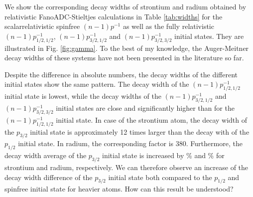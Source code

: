 

We show the corresponding decay
widths of strontium and radium obtained by relativistic FanoADC-Stieltjes
calculations in Table \ref{tab:widths}
for the scalarrelativistic spinfree $(n-1)p^{-1}$ as well as the
fully relativistic $(n-1)p_{1/2,1/2}^{-1}$, $(n-1)p_{3/2,1/2}^{-1}$ and
$(n-1)p_{3/2,3/2}^{-1}$ initial states. They are illustrated in Fig. \ref{fig:gamma}.
To the best of my knowledge, the Auger-Meitner decay widths of these systems have
not been presented in the literature so far.

Despite the difference in absolute numbers, the decay widths
of the different initial states show the same pattern. The decay width of
the $(n-1)p_{1/2,1/2}^{-1}$ initial state is lowest, while the decay widths
of the $(n-1)p_{3/2,1/2}^{-1}$ and
$(n-1)p_{3/2,3/2}^{-1}$ initial states are close and significantly higher than
for the $(n-1)p_{1/2,1/2}^{-1}$ initial state.
In case of the strontium atom, the decay width of the $p_{3/2}$ initial state
is approximately 12 times larger than the decay with of the $p_{1/2}$ initial state.
In radium, the corresponding factor is 380.
Furthermore, the decay width average of the $p_{3/2}$ initial state is increased 
by \unit[114]{\%} and \unit[236]{\%} for strontium and radium, respectively.
We can therefore observe an increase
of the decay width difference of the $p_{3/2}$ initial state both
compared to the $p_{1/2}$ and spinfree initial state for heavier atoms.
How can this result be understood?

